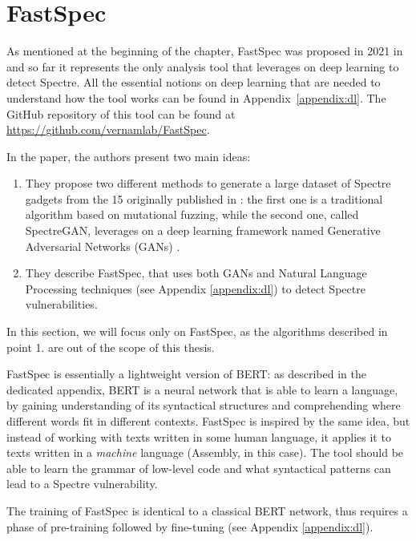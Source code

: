 \documentclass[target=mst,aauheader=aics]{thud}
\theoremstyle{definition}
\begin{document}
	\section{FastSpec}\label{sec:fastspec}
	As mentioned at the beginning of the chapter, FastSpec was proposed in 2021 in \cite{Tol2021} and so far it represents the only analysis tool that leverages on deep learning to detect Spectre. All the essential notions on deep learning that are needed to understand how the tool works can be found in Appendix~\ref{appendix:dl}. The GitHub repository of this tool can be found at \url{https://github.com/vernamlab/FastSpec}. 
	
	In the paper, the authors present two main ideas: 
	\begin{enumerate}
		\item They propose two different methods to generate a large dataset of Spectre gadgets from the 15 originally published in \cite{Kocher2018}: the first one is a traditional algorithm based on mutational fuzzing, while the second one, called SpectreGAN, leverages on a deep learning framework named Generative Adversarial Networks (GANs) \cite{Goodfellow2014}.
		\item They describe FastSpec, that uses both GANs and Natural Language Processing techniques (see Appendix \ref{appendix:dl}) to detect Spectre vulnerabilities.
	\end{enumerate}
	
	In this section, we will focus only on FastSpec, as the algorithms described in point 1. are out of the scope of this thesis.
	
	FastSpec is essentially a lightweight version of BERT: as described in the dedicated appendix, BERT is a neural network that is able to learn a  language, by gaining understanding of its syntactical structures and comprehending where different words fit in different contexts. FastSpec is inspired by the same idea, but instead of working with texts written in some human language, it applies it to texts written in a \textit{machine} language (Assembly, in this case). The tool should be able to learn the grammar of low-level code and what syntactical patterns can lead to a Spectre vulnerability.
	
	The training of FastSpec is identical to a classical BERT network, thus requires a phase of pre-training followed by fine-tuning (see Appendix \ref{appendix:dl}).
	
\end{document}
